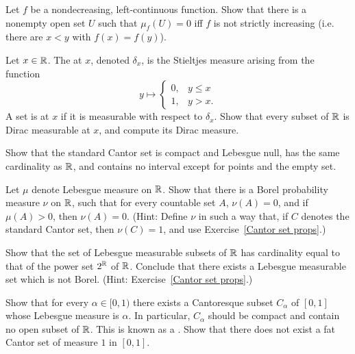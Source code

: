 \begin{exercise}
Let $f$ be a nondecreasing, left-continuous function. Show that there is a nonempty open set $U$ such that $\mu_f(U) = 0$ iff $f$ is not strictly increasing (i.e. there are $x < y$ with $f(x) = f(y)$).
\end{exercise}

\begin{exercise}\label{Dirac measure}
Let $x \in \mathbb{R}$. The  at $x$, denoted $\delta_x$, is the Stieltjes measure arising from the function
$$y \mapsto \begin{cases}
0, &y \leq x\\
1, &y > x.
\end{cases}$$
A set is  at $x$ if it is measurable with respect to $\delta_x$.
Show that every subset of $\mathbb{R}$ is Dirac measurable at $x$, and compute its Dirac measure.
\end{exercise}

\begin{exercise}\label{Cantor set props}
Show that the standard Cantor set is compact and Lebesgue null, has the same cardinality as $\mathbb{R}$, and contains no interval except for points and the empty set.
\end{exercise}

\begin{exercise}
Let $\mu$ denote Lebesgue measure on $\mathbb{R}$.
Show that there is a Borel probability measure $\nu$ on $\mathbb{R}$, such that for every countable set $A$, $\nu(A) = 0$, and if $\mu(A) > 0$, then $\nu(A) = 0$.
(Hint: Define $\nu$ in such a way that, if $C$ denotes the standard Cantor set, then $\nu(C) = 1$, and use Exercise~\ref{Cantor set props}.)
\end{exercise}

\begin{exercise}
Show that the set of Lebesgue measurable subsets of $\mathbb{R}$ has cardinality equal to that of the power set $2^{\mathbb{R}}$ of $\mathbb{R}$. Conclude that there exists a Lebesgue measurable set which is not Borel.
(Hint: Exercise~\ref{Cantor set props}.)
\end{exercise}

\begin{exercise}\label{fat cat}
Show that for every $\alpha \in [0, 1)$ there exists a Cantoresque subset $C_\alpha$ of $[0, 1]$ whose Lebesgue measure is $\alpha$.
In particular, $C_\alpha$ should be compact and contain no open subset of $\mathbb{R}$.
This is known as a .
Show that there does not exist a fat Cantor set of measure $1$ in $[0, 1]$.
\end{exercise}

